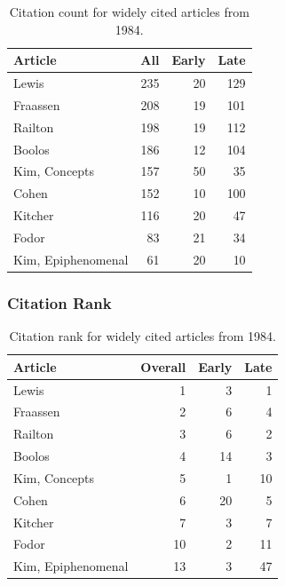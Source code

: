 \documentclass[
  10pt,
  letterpaper,
  DIV=11,
  numbers=noendperiod,
  twoside]{scrartcl}
\begin{document}
\begin{longtable}[]{@{}lrrr@{}}

\caption{\label{tbl-citation-count-1984}Citation count for widely cited
articles from 1984.}

\tabularnewline

\toprule\noalign{}
Article & All & Early & Late \\
\midrule\noalign{}
\endhead
\bottomrule\noalign{}
\endlastfoot
Lewis & 235 & 20 & 129 \\
Fraassen & 208 & 19 & 101 \\
Railton & 198 & 19 & 112 \\
Boolos & 186 & 12 & 104 \\
Kim, Concepts & 157 & 50 & 35 \\
Cohen & 152 & 10 & 100 \\
Kitcher & 116 & 20 & 47 \\
Fodor & 83 & 21 & 34 \\
Kim, Epiphenomenal & 61 & 20 & 10 \\

\end{longtable}

\subsubsection*{Citation Rank}\label{citation-rank-8}

\begin{longtable}[]{@{}lrrr@{}}

\caption{\label{tbl-citation-rank-1984}Citation rank for widely cited
articles from 1984.}

\tabularnewline

\toprule\noalign{}
Article & Overall & Early & Late \\
\midrule\noalign{}
\endhead
\bottomrule\noalign{}
\endlastfoot
Lewis & 1 & 3 & 1 \\
Fraassen & 2 & 6 & 4 \\
Railton & 3 & 6 & 2 \\
Boolos & 4 & 14 & 3 \\
Kim, Concepts & 5 & 1 & 10 \\
Cohen & 6 & 20 & 5 \\
Kitcher & 7 & 3 & 7 \\
Fodor & 10 & 2 & 11 \\
Kim, Epiphenomenal & 13 & 3 & 47 \\

\end{longtable}
\end{document}
